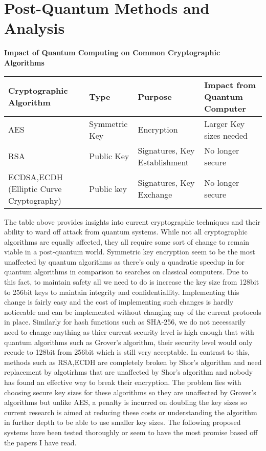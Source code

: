\documentclass[10pt,a4paper]{article}
\begin{document}
\section{Post-Quantum Methods and Analysis}
\begin{center}
	\textbf{Impact of Quantum Computing on Common Cryptographic Algorithms}
	\begin{tabular}{ | m{5cm} | m{2cm} | m{5cm} | m{4cm} | }
		\hline
		Cryptographic Algorithm & Type & Purpose & Impact from Quantum Computer \\
		\hline
		AES & Symmetric Key & Encryption & Larger Key sizes needed \\
		\hline
		RSA & Public Key & Signatures, Key Establishment & No longer secure \\
		\hline
		ECDSA,ECDH (Elliptic Curve Cryptography)  &Public key &Signatures, Key Exchange &No longer secure \\
		\hline
	\end{tabular}
\end{center}
The table above provides insights into current cryptographic techniques and their ability to ward off attack from quantum systems. While not all cryptographic algorithms are equally affected, they all require some sort of change to remain viable in a post-quantum world. Symmetric key encryption seem to be the most unaffected by quantum algorithms as there's only a quadratic speedup in for quantum algorithms in comparison to searches on classical computers. Due to this fact, to maintain safety all we need to do is increase the key size from 128bit to 256bit keys to maintain integrity and confidentiallity. Implementing this change is fairly easy and the cost of implementing such changes is hardly noticeable and can be implemented without changing any of the current protocols in place. Similarly for hash functions such as SHA-256, we do not necessarily need to change anything as thier current security level is high enough that with quantum algorithms such as Grover's algorithm, their security level would only recude to 128bit from 256bit which is still very acceptable.
\newline
\newline
In contrast to this, methods such as RSA,ECDH are completely broken by Shor's algorithm and need replacement by algotirhms that are unaffected by Shor's algorithm and nobody has found an effective way to break their encryption. The problem lies with choosing secure key sizes for these algorithms so they are unaffected by Grover's algorithms but unlike AES, a penalty is incurred on doubling the key sizes so current research is aimed at reducing these costs or understanding the algorithm in further depth to be able to use smaller key sizes. The following proposed systems have been tested thoroughly or seem to have the most promise based off the papers I have read.
\end{document}
